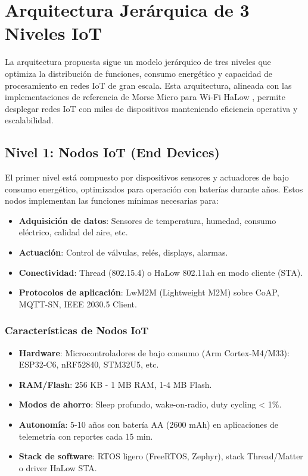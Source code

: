 \section{Arquitectura Jerárquica de 3 Niveles IoT}

La arquitectura propuesta sigue un modelo jerárquico de tres niveles que optimiza la distribución de funciones, consumo energético y capacidad de procesamiento en redes IoT de gran escala. Esta arquitectura, alineada con las implementaciones de referencia de Morse Micro para Wi-Fi HaLow \cite{morse_micro_mm8108_2025}, permite desplegar redes IoT con miles de dispositivos manteniendo eficiencia operativa y escalabilidad.

\subsection{Nivel 1: Nodos IoT (End Devices)}

El primer nivel está compuesto por dispositivos sensores y actuadores de bajo consumo energético, optimizados para operación con baterías durante años. Estos nodos implementan las funciones mínimas necesarias para:

\begin{itemize}
    \item \textbf{Adquisición de datos}: Sensores de temperatura, humedad, consumo eléctrico, calidad del aire, etc.
    \item \textbf{Actuación}: Control de válvulas, relés, displays, alarmas.
    \item \textbf{Conectividad}: Thread (802.15.4) o HaLow 802.11ah en modo cliente (STA).
    \item \textbf{Protocolos de aplicación}: LwM2M (Lightweight M2M) sobre CoAP, MQTT-SN, IEEE 2030.5 Client.
\end{itemize}

\subsubsection{Características de Nodos IoT}

\begin{itemize}
    \item \textbf{Hardware}: Microcontroladores de bajo consumo (Arm Cortex-M4/M33): ESP32-C6, nRF52840, STM32U5, etc.
    \item \textbf{RAM/Flash}: 256 KB - 1 MB RAM, 1-4 MB Flash.
    \item \textbf{Modos de ahorro}: Sleep profundo, wake-on-radio, duty cycling < 1\%.
    \item \textbf{Autonomía}: 5-10 años con batería AA (2600 mAh) en aplicaciones de telemetría con reportes cada 15 min.
    \item \textbf{Stack de software}: RTOS ligero (FreeRTOS, Zephyr), stack Thread/Matter o driver HaLow STA.
\end{itemize}

